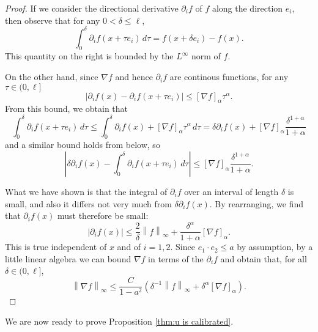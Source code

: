 \documentclass[11pt]{amsart}
\theoremstyle{remark}
\theoremstyle{definition}
\newcommand{\norm}[1]{\left\lVert#1\right\rVert}
\newcommand{\paren}[1]{\left( #1 \right)}
\newcommand{\bracket}[1]{\left[ #1 \right]}
\newcommand{\abs}[1]{\left\lvert #1 \right\rvert}
\newcommand{\del}{\partial}
\newcommand{\grad}{\nabla}
\newcommand{\n}{^{-1}}
\begin{document}
\begin{proof}
If we consider the directional derivative $\del_i f$ of $f$ along the direction $e_i$, then observe that for any $0 < \delta \leq \ell$,
\[ \int_0^\delta \del_i f(x + \tau e_i) \,d\tau = f(x+\delta e_i) - f(x). \]
This quantity on the right is bounded by the $L^\infty$ norm of $f$.  

On the other hand, since $\grad f$ and hence $\del_i f$ are continous functions, for any $\tau \in (0,\ell]$
\[ \abs{\del_i f(x) - \del_i f(x+\tau e_i)} \leq \bracket{\grad f}_\alpha \tau^\alpha. \]
From this bound, we obtain that
\[ \int_0^\delta \del_i f(x + \tau e_i) \,d\tau \leq \int_0^\delta \del_i f(x) + \bracket{\grad f}_\alpha \tau^\alpha \,d\tau = \delta \del_i f(x) + \bracket{\grad f}_\alpha \frac{\delta^{1+\alpha}}{1+\alpha} \]
and a similar bound holds from below, so
\[ \abs{ \delta \del_i f(x) - \int_0^\delta \del_i f(x + \tau e_i) \,d\tau} \leq \bracket{\grad f}_\alpha \frac{\delta^{1+\alpha}}{1+\alpha}. \]

What we have shown is that the integral of $\del_i f$ over an interval of length $\delta$ is small, and also it differs not very much from $\delta \del_i f(x)$.  By rearranging, we find that $\del_i f(x)$ must therefore be small:
\[ \abs{\del_i f(x)} \leq \frac{2}{\delta} \norm{f}_\infty + \frac{\delta^\alpha}{1+\alpha} \bracket{\grad f}_\alpha. \]
This is true independent of $x$ and of $i=1,2$.  Since $e_1 \cdot e_2 \leq a$ by assumption, by a little linear algebra we can bound $\grad f$ in terms of the $\del_i f$ and obtain that, for all $\delta \in (0,\ell]$,
\[ \norm{\grad f}_\infty \leq \frac{C}{1-a^2} \paren{ \delta\n \norm{f}_\infty + \delta^\alpha \bracket{\grad f}_\alpha }. \]

\end{proof}

We are now ready to prove Proposition \ref{thm:u is calibrated}.  
\end{document}
